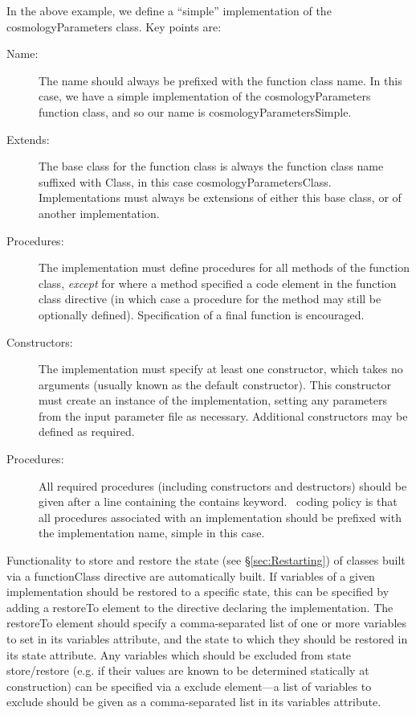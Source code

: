 In the above example, we define a ``simple'' implementation of the {\normalfont cosmologyParameters} class. Key points are:
\begin{description}
\item[Name:] The name should always be prefixed with the function class name. In this case, we have a {\normalfont \ttfamily simple} implementation of the {\normalfont \ttfamily cosmologyParameters} function class, and so our name is {\normalfont \ttfamily cosmologyParametersSimple}.
\item[Extends:] The base class for the function class is always the function class name suffixed with {\normalfont \ttfamily Class}, in this case {\normalfont \ttfamily cosmologyParametersClass}. Implementations must always be extensions of either this base class, or of another implementation.
\item[Procedures:] The implementation must define procedures for all methods of the function class, \emph{except} for where a method specified a {\normalfont \ttfamily code} element in the function class directive (in which case a procedure for the method may still be optionally defined). Specification of a {\normalfont \ttfamily final} function is encouraged.
\item[Constructors:] The implementation must specify at least one constructor, which takes no arguments (usually known as the default constructor). This constructor must create an instance of the implementation, setting any parameters from the input parameter file as necessary. Additional constructors may be defined as required.
\item[Procedures:] All required procedures (including constructors and destructors) should be given after a line containing the {\normalfont \ttfamily contains} keyword. \glc\ coding policy is that all procedures associated with an implementation should be prefixed with the implementation name, {\normalfont \ttfamily simple} in this case.
\end{description}

Functionality to store and restore the state (see \S\ref{sec:Restarting}) of classes built via a {\normalfont \ttfamily functionClass} directive are automatically built. If variables of a given implementation should be restored to a specific state, this can be specified by adding a {\normalfont \ttfamily restoreTo} element to the directive declaring the implementation. The {\normalfont \ttfamily restoreTo} element should specify a comma-separated list of one or more variables to set in its {\normalfont \ttfamily variables} attribute, and the state to which they should be restored in its {\normalfont \ttfamily state} attribute. Any variables which should be excluded from state store/restore (e.g. if their values are known to be determined statically at construction) can be specified via a {\normalfont \ttfamily exclude} element---a list of variables to exclude should be given as a comma-separated list in its {\normalfont \ttfamily variables} attribute.

